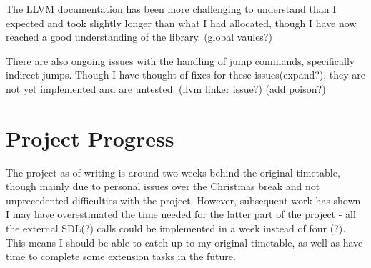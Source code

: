 \documentclass[12pt,a4paper,twoside]{article}
\begin{document}
The LLVM documentation has been more challenging to understand than I expected and took slightly longer than what I had allocated, though I have now reached a good understanding of the library.
(global vaules?)

There are also ongoing issues with the handling of jump commands, specifically indirect jumps. Though I have thought of fixes for these issues(expand?), they are not yet implemented and are untested.
(llvm linker issue?)
(add poison?)

\section*{Project Progress}
The project as of writing is around two weeks behind the original timetable, though mainly due to personal issues over the Christmas break and not unprecedented difficulties with the project. However, subsequent work has shown I may have overestimated the time needed for the latter part of the project - all the external SDL(?) calls could be implemented in a week instead of four (?). This means I should be able to catch up to my original timetable, as well as have time to complete some extension tasks in the future.
\end{document}
